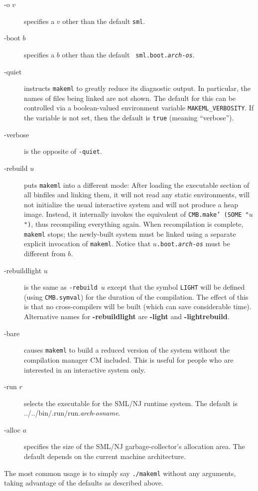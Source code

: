 \begin{description}
\item[-o $v$] specifies a $v$ other than the default {\tt sml}.
\item[-boot $b$] specifies a $b$ other than the default {\tt
sml.boot.{\it arch}-{\it os}}.
\item[-quiet] instructs {\tt makeml} to greatly reduce its
diagnostic output.  In particular, the names of files being linked are
not shown.  The default for this can be controlled via a
boolean-valued environment variable {\tt MAKEML\_VERBOSITY}.  If the
variable is not set, then the default is {\tt true} (meaning ``verbose'').
\item[-verbose] is the opposite of {\tt -quiet}.
\item[-rebuild $u$] puts {\tt makeml} into a different mode: After
loading the executable section of all binfiles and linking them, it
will not read any static environments, will not initialize the usual
interactive system and will not produce a heap image.  Instead, it
internally invokes the equivalent of {\tt CMB.make' (SOME
\verb+"+$u$\verb+"+)}, thus recompiling everything again.  When
recompilation is complete, {\tt makeml} stops; the newly-built system
must be linked using a separate explicit invocation of {\tt makeml}.
Notice that {\tt $u$.boot.{\it arch}-{\it os}} must be different from
$b$.
\item[-rebuildlight $u$] is the same as {\tt -rebuild $u$} except that
the symbol {\tt LIGHT} will be defined (using {\tt CMB.symval}) for
the duration of the compilation.  The effect of this is that no
cross-compilers will be built (which can save considerable time).
Alternative names for {\bf -rebuildlight} are {\bf -light} and {\bf
-lightrebuild}.
\item[-bare] causes {\tt makeml} to build a reduced version of
the system without the compilation manager CM included.  This is
useful for people who are interested in an interactive system only.
\item[-run $r$] selects the executable for the SML/NJ runtime system.
The default is {../../bin/.run/run.{\it arch}-{\it osname}}.
\item[-alloc $a$] specifies the size of the SML/NJ garbage-collector's
allocation area.  The default depends on the current machine
architecture.
\end{description}

The most common usage is to simply say {\tt ./makeml} without any
arguments, taking advantage of the defaults as described above.

